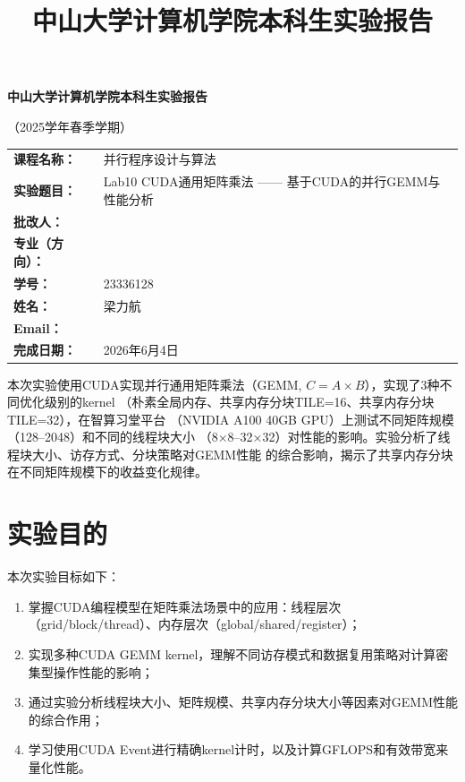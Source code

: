 \documentclass[UTF8,a4paper,12pt,fontset=none]{ctexart}
\title{\bfseries 中山大学计算机学院本科生实验报告}
\author{}
\date{}
\begin{document}
\begin{titlepage}
  \centering
  {\bfseries 中山大学计算机学院本科生实验报告\par}
  \vspace{0.5em}
  {（2025学年春季学期）\par}
  \vspace{2em}

  \begin{tabularx}{0.9\textwidth}{>{\bfseries}p{4cm}X}
    课程名称： & 并行程序设计与算法 \\
    实验题目： & Lab10 CUDA通用矩阵乘法 —— 基于CUDA的并行GEMM与性能分析 \\
    批改人： & \\
    专业（方向）： & \\
    学号： & 23336128 \\
    姓名： & 梁力航 \\
    Email： & \\
    完成日期： & 2026年6月4日 \\
  \end{tabularx}

  \vfill
  \begin{minipage}{0.88\textwidth}
    \small
    本次实验使用CUDA实现并行通用矩阵乘法（GEMM, $C = A \times B$），实现了3种不同优化级别的kernel
    （朴素全局内存、共享内存分块TILE=16、共享内存分块TILE=32），在智算习堂平台
    （NVIDIA A100 40GB GPU）上测试不同矩阵规模（128--2048）和不同的线程块大小
    （8×8--32×32）对性能的影响。实验分析了线程块大小、访存方式、分块策略对GEMM性能
    的综合影响，揭示了共享内存分块在不同矩阵规模下的收益变化规律。
  \end{minipage}
\end{titlepage}

\section{实验目的}

本次实验目标如下：
\begin{enumerate}[leftmargin=2.2em]
  \item 掌握CUDA编程模型在矩阵乘法场景中的应用：线程层次（grid/block/thread）、内存层次（global/shared/register）；
  \item 实现多种CUDA GEMM kernel，理解不同访存模式和数据复用策略对计算密集型操作性能的影响；
  \item 通过实验分析线程块大小、矩阵规模、共享内存分块大小等因素对GEMM性能的综合作用；
  \item 学习使用CUDA Event进行精确kernel计时，以及计算GFLOPS和有效带宽来量化性能。
\end{enumerate}
\end{document}
